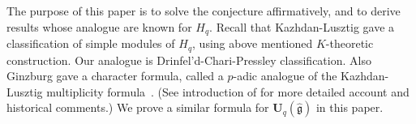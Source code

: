 \documentclass[12pt]{amsart}
\def\Bbb{\mathbb}
\theoremstyle{definition}
\theoremstyle{remark}
\numberwithin{equation}{subsection}
\newcommand{\C}{{\Bbb C}}
\newcommand{\Z}{{\Bbb Z}}
\newcommand{\Ua}{{\mathbf U}_q(\widehat{\mathfrak g})} %
\begin{document}
The purpose of this paper is to solve the conjecture affirmatively,
and to derive results whose analogue are known for $H_q$.
%
Recall that Kazhdan-Lusztig \cite{KL} gave a classification of simple
modules of $H_q$, using above mentioned $K$-theoretic construction.
%
Our analogue is Drinfel'd-Chari-Pressley classification.
%
Also Ginzburg gave a character formula, called a $p$-adic analogue of
the Kazhdan-Lusztig multiplicity formula~\cite{Gi-book}.
%
(See introduction of \cite{Gi-book} for more detailed account and
historical comments.)
%
We prove a similar formula for $\Ua$ in this paper.
%

\end{document}
